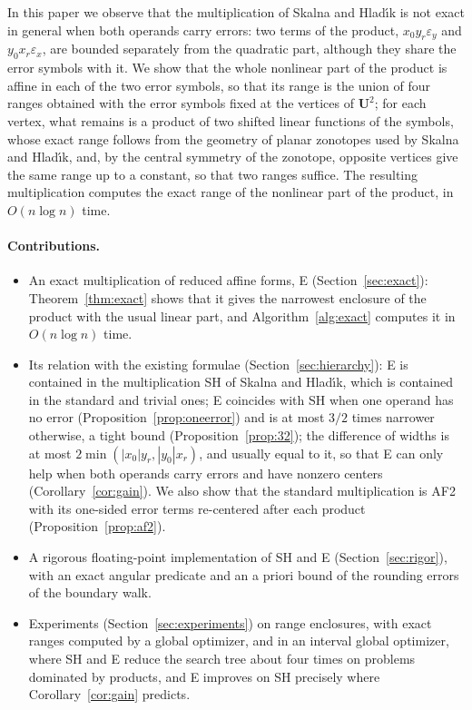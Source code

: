 \documentclass[11pt]{article}
\theoremstyle{definition}
\newcommand{\U}{\mathbf{U}}
\newcommand{\eps}{\varepsilon}
\newcommand{\ex}{\eps_x}
\newcommand{\ey}{\eps_y}
\begin{document}
In this paper we observe that the multiplication of Skalna and Hlad\'{\i}k is not exact in general when both operands carry errors: two terms of the product, $x_0 y_r\ey$ and $y_0 x_r\ex$, are bounded separately from the quadratic part, although they share the error symbols with it. We show that the whole nonlinear part of the product is affine in each of the two error symbols, so that its range is the union of four ranges obtained with the error symbols fixed at the vertices of $\U^2$; for each vertex, what remains is a product of two shifted linear functions of the symbols, whose exact range follows from the geometry of planar zonotopes used by Skalna and Hlad\'{\i}k, and, by the central symmetry of the zonotope, opposite vertices give the same range up to a constant, so that two ranges suffice. The resulting multiplication computes the exact range of the nonlinear part of the product, in $O(n\log n)$ time.

\paragraph{Contributions.}
\begin{itemize}
\item An exact multiplication of reduced affine forms, E (Section~\ref{sec:exact}): Theorem~\ref{thm:exact} shows that it gives the narrowest enclosure of the product with the usual linear part, and Algorithm~\ref{alg:exact} computes it in $O(n\log n)$ time.
\item Its relation with the existing formulae (Section~\ref{sec:hierarchy}): E is contained in the multiplication SH of Skalna and Hlad\'{\i}k, which is contained in the standard and trivial ones; E coincides with SH when one operand has no error (Proposition~\ref{prop:oneerror}) and is at most $3/2$ times narrower otherwise, a tight bound (Proposition~\ref{prop:32}); the difference of widths is at most $2\min(|x_0|y_r,|y_0|x_r)$, and usually equal to it, so that E can only help when both operands carry errors and have nonzero centers (Corollary~\ref{cor:gain}). We also show that the standard multiplication is AF2~\cite{messine2002extentions} with its one-sided error terms re-centered after each product (Proposition~\ref{prop:af2}).
\item A rigorous floating-point implementation of SH and E (Section~\ref{sec:rigor}), with an exact angular predicate and an a priori bound of the rounding errors of the boundary walk.
\item Experiments (Section~\ref{sec:experiments}) on range enclosures, with exact ranges computed by a global optimizer, and in an interval global optimizer, where SH and E reduce the search tree about four times on problems dominated by products, and E improves on SH precisely where Corollary~\ref{cor:gain} predicts.
\end{itemize}
\end{document}
